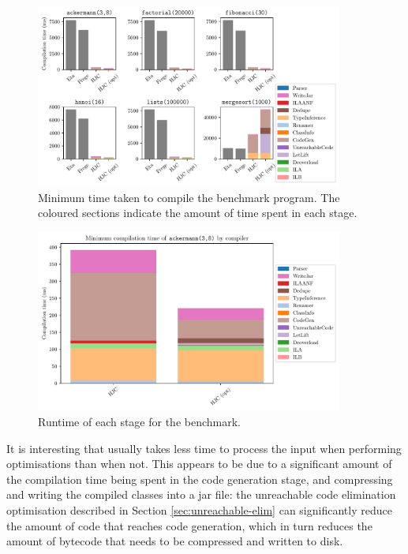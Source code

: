 \documentclass[dissertation.tex]{subfiles}
\begin{document}
{{        \begin{figure}[h]
            \centering
            \captionsetup{width=0.8\textwidth}
            \includegraphics[width=0.9\textwidth]{graphs/compiler_perf.pdf}
            \caption{Minimum time taken to compile the benchmark program. The coloured sections indicate the amount of time spent in each stage.}
            \label{fig:compiler-perf}
        \end{figure}
        \begin{figure}[h]
            \centering
            \captionsetup{width=0.8\textwidth}
            \includegraphics[width=0.9\textwidth]{graphs/compiler_perf_mine_ackermann.pdf}
            \caption{Runtime of each stage for the  benchmark.}
            \label{fig:compiler-perf-ackermann}
        \end{figure}

        It is interesting that \compilername usually takes less time to process the input when performing optimisations than when not. This appears to be due to a significant amount of the compilation time being spent in the code generation stage, and compressing and writing the compiled classes into a jar file: the unreachable code elimination optimisation described in Section \ref{sec:unreachable-elim} can significantly reduce the amount of code that reaches code generation, which in turn reduces the amount of bytecode that needs to be compressed and written to disk.
    }
}
\end{document}
